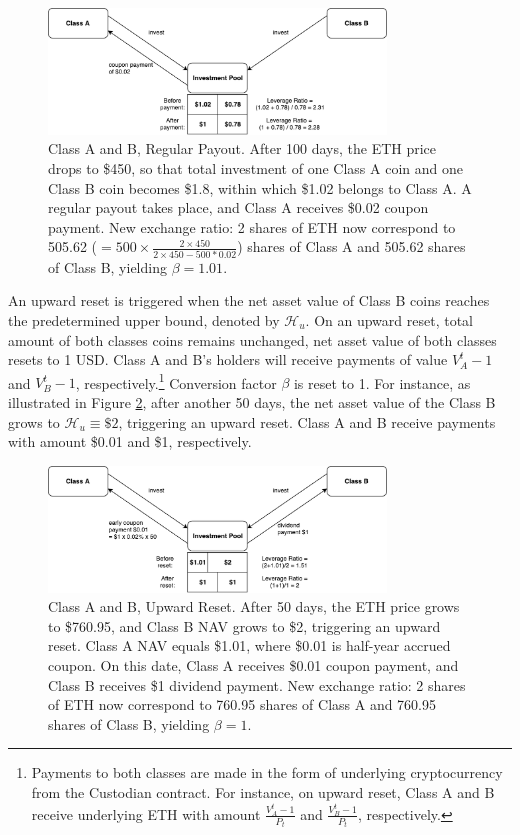 \documentclass[final,pdftex]{ectaart}
\theoremstyle{plain}
\begin{document}
\begin{figure}[h]
	\centering
	\includegraphics[width=0.8\textwidth]{periodic}
	\caption{Class A and B, Regular Payout. After 100 days, the ETH price drops to \$450, so that total investment of one Class A coin and one Class B coin becomes \$1.8, within which \$1.02 belongs to Class A. A regular payout takes place, and Class A receives \$0.02 coupon payment. New exchange ratio: 2 shares of ETH now correspond to 505.62 ($=500\times\frac{2\times450}{2\times450-500*0.02}$) shares of Class A and 505.62 shares of Class B, yielding $\beta=1.01$.}\label{fig:regular}
\end{figure}

An upward reset is triggered when the net asset value of Class B coins reaches the predetermined upper bound, denoted by $\mathcal{H}_{u}$. On an upward reset, total amount of both classes coins remains unchanged, net asset value of both classes resets to 1 USD. Class A and B's holders will receive payments of value $V_{A}^{t}-1$ and $V_{B}^{t}-1$, respectively.\footnote{Payments to both classes are made in the form of underlying cryptocurrency from the Custodian contract. For instance, on upward reset, Class A and B receive underlying ETH with amount $\frac{V_{A}^{t}-1}{P_{t}}$ and $\frac{V_{B}^{t}-1}{P_{t}}$, respectively.} Conversion factor $\beta$ is reset to 1. For instance, as illustrated in Figure \ref{fig:upward}, after another 50 days, the net asset value of the Class B grows to $\mathcal{H}_{u}\equiv \$2$, triggering an upward reset. Class A and B receive payments with amount \$0.01 and \$1, respectively.

\begin{figure}[h]
	\centering
	\includegraphics[width=0.8\textwidth]{upward}
	\caption{Class A and B, Upward Reset. After 50 days, the ETH price grows to \$760.95, and Class B NAV grows to \$2, triggering an upward reset. Class A NAV equals \$1.01, where \$0.01 is half-year accrued coupon. On this date, Class A receives \$0.01 coupon payment, and Class B receives \$1 dividend payment. New exchange ratio: 2 shares of ETH now correspond to 760.95 shares of Class A and 760.95 shares of Class B, yielding $\beta=1$. }\label{fig:upward}
\end{figure}
\end{document}
